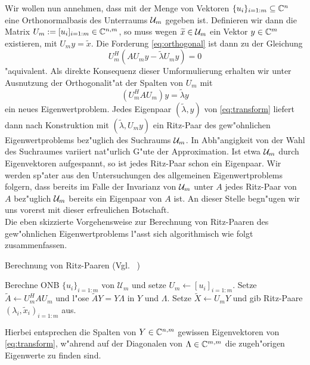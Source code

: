 Wir wollen nun annehmen, dass mit der Menge von Vektoren $\{u_i\}_{i=1:m}\subseteq \mathbb{C}^n$ eine Orthonormalbasis
des Unterraums $\mathcal{U}_m$ gegeben ist. Definieren wir dann die Matrix $U_m :=[u_i]_{i=1:m}\in\mathbb{C}^{n,m}$, so muss wegen $\widetilde{x}\in\mathcal{U}_m$
ein Vektor $y\in\mathbb{C}^m$ existieren, mit $U_m y = \widetilde{x}$. Die Forderung \eqref{eq:orthogonal}
ist dann zu der Gleichung
\[
U_m^H(AU_m y - \widetilde{\lambda} U_m y) = 0
\]
"aquivalent. Als direkte Konsequenz dieser Umformulierung erhalten wir unter Ausnutzung
der Orthogonalit"at der Spalten von $U_m$ mit
\begin{equation}\label{eq:transform}
(U_m^H A U_m) y = \widetilde{\lambda}y
\end{equation}
ein neues Eigenwertproblem. Jedes Eigenpaar $(\widetilde{\lambda},y)$ von \eqref{eq:transform}
liefert dann nach Konstruktion mit $(\widetilde{\lambda}, U_m y)$ ein Ritz-Paar des gew"ohnlichen
Eigenwertproblems bez"uglich des Suchraums $\mathcal{U}_m$. In Abh"angigkeit von der Wahl
des Suchraumes variiert nat"urlich G"ute der Approximation. Ist etwa $\mathcal{U}_m$
durch Eigenvektoren aufgespannt, so ist jedes Ritz-Paar schon ein Eigenpaar.
Wir werden sp"ater aus den Untersuchungen des allgemeinen Eigenwertproblems folgern,
dass bereits im Falle der Invarianz von $\mathcal{U}_m$ unter $A$ jedes Ritz-Paar von $A$ bez"uglich $\mathcal{U}_m$ bereits ein Eigenpaar von $A$ ist.
An dieser Stelle begn"ugen wir uns vorerst mit dieser erfreulichen Botschaft.\\

Die eben skizzierte Vorgehensweise zur Berechnung von Ritz-Paaren des gew"ohnlichen Eigenwertproblems
l"asst sich algorithmisch wie folgt zusammenfassen.

\begin{algorithm}\label{alg:rp}
\caption{Berechnung von Ritz-Paaren (Vgl. ~\cite[98]{saad})}
\begin{algorithmic}[1]
\State Berechne ONB $\{u_i\}_{i=1:m}$ von $\mathcal{U}_m$ und setze $U_m\gets[u_i]_{i=1:m}$.
\State Setze $\widetilde{A}\gets U_m^H A U_m$ und
l"ose $\widetilde{A}Y = Y \Lambda$ in $Y$ und
$\Lambda$.
\State Setze $\widetilde{X} \gets U_m Y$ und gib Ritz-Paare $(\lambda_i, \widetilde{x}_i)_{i=1:m}$ aus.
\end{algorithmic}
\end{algorithm}

Hierbei entsprechen die Spalten von $Y\in\mathbb{C}^{n,m}$ gewissen Eigenvektoren von \eqref{eq:transform}, w"ahrend auf der Diagonalen von $\Lambda\in\mathbb{C}^{m,m}$
die zugeh"origen Eigenwerte zu finden sind.\\

